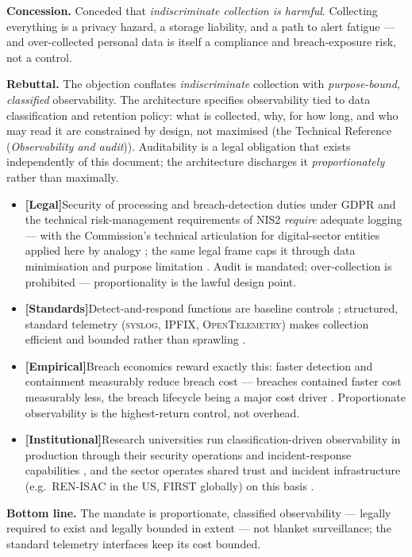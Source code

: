\documentclass[11pt,a4paper,twoside]{book}
\let\citep\parencite
\newcommand{\institution}[1]{\textsc{#1}}
\newcommand{\evlegal}{\textcolor{BrickRed}{\textbf{[Legal]}}\space}
\newcommand{\evstd}{\textcolor{NavyBlue}{\textbf{[Standards]}}\space}
\newcommand{\evempirical}{\textcolor{OliveGreen}{\textbf{[Empirical]}}\space}
\newcommand{\evinst}{\textcolor{Slate}{\textbf{[Institutional]}}\space}
\newcommand{\trref}[1]{the Technical Reference (\emph{#1})}
\begin{document}
\begin{answerbox}[Response O7.1]
\textbf{Concession.} Conceded that \emph{indiscriminate collection is harmful}.
Collecting everything is a privacy hazard, a storage liability, and a path to
alert fatigue --- and over-collected personal data is itself a compliance and
breach-exposure risk, not a control.

\medskip
\textbf{Rebuttal.} The objection conflates \emph{indiscriminate} collection
with \emph{purpose-bound, classified} observability. The architecture
specifies observability tied to data classification and retention policy:
what is collected, why, for how long, and who may read it are constrained by
design, not maximised (\trref{Observability and audit}). Auditability is a
legal obligation that exists independently of this document; the architecture
discharges it \emph{proportionately} rather than maximally.

\begin{itemize}[leftmargin=1.4em,itemsep=2pt]
  \item \evlegal Security of processing and breach-detection duties under
        \institution{GDPR} \citep{gdpr} and the technical risk-management
        requirements of \institution{NIS2} \citep{nis2} \emph{require}
        adequate logging --- with the Commission's technical
        articulation for digital-sector entities applied here by
        analogy \citep{eu-regulation-2024-2690};
        the same legal frame caps it through data minimisation and purpose
        limitation \citep{gdpr}. Audit is mandated; over-collection is
        prohibited --- proportionality is the lawful design point.
  \item \evstd Detect-and-respond functions are baseline controls
        \citep{nist-csf,nist-sp800-53,iso27001}; structured, standard
        telemetry (\institution{syslog}, \institution{IPFIX},
        \institution{OpenTelemetry}) makes collection efficient and bounded
        rather than sprawling
        \citep{rfc-5424-syslog,rfc-7011-ipfix,opentelemetry-spec}.
  \item \evempirical Breach economics reward exactly this: faster detection
        and containment measurably reduce breach cost --- breaches
        contained faster cost measurably less, the breach lifecycle
        being a major cost driver
        \citep{ibm-cost-breach-2024,verizon-dbir2024}. Proportionate
        observability is the highest-return control, not overhead.
  \item \evinst Research universities run classification-driven observability
        in production through their security operations and incident-response
        capabilities \citep{umich-safecomputing,stanford-uit}, and the
        sector operates shared trust and incident infrastructure
        (e.g.\ \institution{REN-ISAC} in the US, \institution{FIRST} globally) on this basis
        \citep{ren-isac,first}.
\end{itemize}

\textbf{Bottom line.} The mandate is proportionate, classified observability
--- legally required to exist and legally bounded in extent --- not blanket
surveillance; the standard telemetry interfaces keep its cost bounded.
\end{answerbox}
\end{document}
